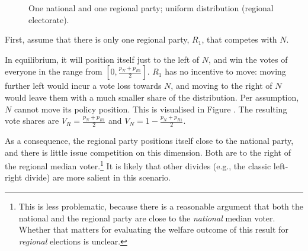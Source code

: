 \documentclass[11pt]{article}
\begin{document}
\begin{figure}[ht]
    \centering 
     \caption{One national and one regional party; uniform distribution (regional electorate).} \label{fig:mod1}
 \end{figure}

 First, assume that there is only one regional party, $R_1$, that competes with $N$. 

 In equilibrium, it will position itself just to the left of $N$, and win the votes of everyone in the range from $[0, \frac{p_N + p_{R1}}{2}]$. $R_1$ has no incentive to move: moving further left would incur a vote loss towards $N$, and moving to the right of $N$ would leave them with a much smaller share of the distribution. Per assumption, $N$ cannot move its policy position. This is visualised in Figure \label{fig:mod1}. The resulting vote shares are $V_R = \frac{p_N + p_{R1}}{2}$ and $V_N = 1 - \frac{p_N + p_{R1}}{2}$.

As a consequence, the regional party positions itself close to the national party, and there is little issue competition on this dimension. Both are to the right of the regional median voter.\footnote{This is less problematic, because there is a reasonable argument that both the national and the regional party are close to the \textit{national} median voter. Whether that matters for evaluating the welfare outcome of this result for \textit{regional} elections is unclear.} It is likely that other divides (e.g., the classic left-right divide) are more salient in this scenario.
\end{document}
